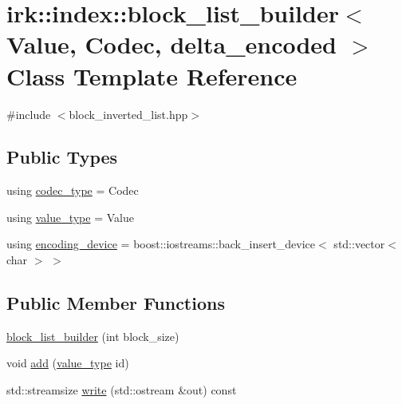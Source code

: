 \hypertarget{classirk_1_1index_1_1block__list__builder}{}\section{irk\+:\+:index\+:\+:block\+\_\+list\+\_\+builder$<$ Value, Codec, delta\+\_\+encoded $>$ Class Template Reference}
\label{classirk_1_1index_1_1block__list__builder}


{\ttfamily \#include $<$block\+\_\+inverted\+\_\+list.\+hpp$>$}

\subsection*{Public Types}
\begin{DoxyCompactItemize}
\item 
using \mbox{\hyperlink{classirk_1_1index_1_1block__list__builder_a5f67d973ddc3719baf9b62e19c6ab875}{codec\+\_\+type}} = Codec
\item 
using \mbox{\hyperlink{classirk_1_1index_1_1block__list__builder_aee4746d79079e00283a5f7a3ad071b5e}{value\+\_\+type}} = Value
\item 
using \mbox{\hyperlink{classirk_1_1index_1_1block__list__builder_a860cd8cc2694c917a48d1de1c221d00f}{encoding\+\_\+device}} = boost\+::iostreams\+::back\+\_\+insert\+\_\+device$<$ std\+::vector$<$ char $>$ $>$
\end{DoxyCompactItemize}
\subsection*{Public Member Functions}
\begin{DoxyCompactItemize}
\item 
\mbox{\hyperlink{classirk_1_1index_1_1block__list__builder_a7d34ddbad0ae90c5623689f194e21571}{block\+\_\+list\+\_\+builder}} (int block\+\_\+size)
\item 
void \mbox{\hyperlink{classirk_1_1index_1_1block__list__builder_a689ecb66563dd8ccdfd26d103da377a3}{add}} (\mbox{\hyperlink{classirk_1_1index_1_1block__list__builder_aee4746d79079e00283a5f7a3ad071b5e}{value\+\_\+type}} id)
\item 
std\+::streamsize \mbox{\hyperlink{classirk_1_1index_1_1block__list__builder_a003cb5e11a447ddf8ae03da4ba47a036}{write}} (std\+::ostream \&out) const
\end{DoxyCompactItemize}


